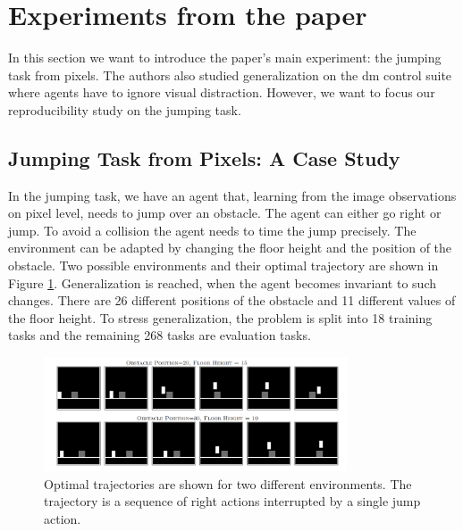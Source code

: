 \documentclass{usiinftr}
\begin{document}
\section{Experiments from the paper}
In this section we want to introduce the paper's main experiment: the jumping task from pixels. The authors also studied generalization on the dm control suite where agents have to ignore visual distraction. However, we want to focus our reproducibility study on the jumping task.
\subsection{Jumping Task from Pixels: A Case Study}
In the jumping task, we have an agent that, learning from the image observations on pixel level, needs to jump over an obstacle. The agent can either go right or jump. To avoid a collision the agent needs to time the jump precisely. The environment can be adapted by changing the floor height and the position of the obstacle. Two possible environments and their optimal trajectory are shown in Figure \ref{fig: optimal_trajectories}. Generalization is reached, when the agent becomes invariant to such changes.
There are 26 different positions of the obstacle and 11 different values of the floor height. To stress generalization, the problem is split into 18 training tasks and the remaining 268 tasks are evaluation tasks.
\begin{figure}[h] 
\centering
\includegraphics[width = 0.8\textwidth]{figures/optimal_trajectories.png}
\caption{\label{fig: optimal_trajectories}Optimal trajectories are shown for two different environments. The trajectory is a sequence of right actions interrupted by a single jump action. \cite{agarwal2021contrastive} }
\end{figure}
\end{document}
